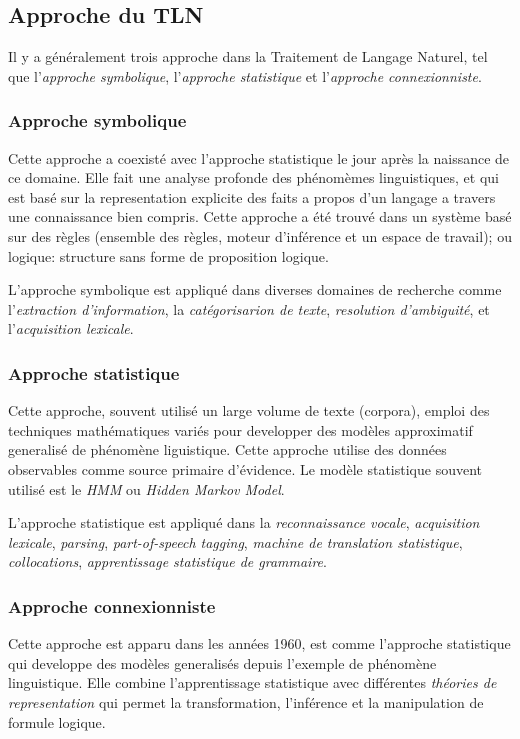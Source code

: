 \subsection{Approche du TLN}
Il y a généralement trois approche dans la Traitement de Langage Naturel, tel que l'\textit{approche symbolique}, l'\textit{approche statistique} et l'\textit{approche connexionniste}.

\subsubsection{Approche symbolique}
Cette approche a coexisté avec l'approche statistique le jour après la naissance de ce domaine. Elle fait une analyse profonde des phénomèmes linguistiques, et qui est basé sur la representation explicite des faits a propos d'un langage a travers une connaissance bien compris. Cette approche a été trouvé dans un système basé sur des règles (ensemble des règles, moteur d'inférence et un espace de travail); ou logique: structure sans forme de proposition logique.

L'approche symbolique est appliqué dans diverses domaines de recherche comme l'\textit{extraction d'information}, la \textit{catégorisarion de texte}, \textit{resolution d'ambiguité}, et l'\textit{acquisition lexicale}.

\subsubsection{Approche statistique}
Cette approche, souvent utilisé un large volume de texte (corpora), emploi des techniques mathématiques variés pour developper des modèles approximatif generalisé de phénomène liguistique. Cette approche utilise des données observables comme source primaire d'évidence. Le modèle statistique souvent utilisé est le \emph{HMM} ou \emph{Hidden Markov Model}.

L'approche statistique est appliqué dans la \textit{reconnaissance vocale}, \textit{acquisition lexicale}, \textit{parsing}, \textit{part-of-speech tagging}, \textit{machine de translation statistique}, \textit{collocations}, \textit{apprentissage statistique de grammaire}.

\subsubsection{Approche connexionniste}
Cette approche est apparu dans les années 1960, est comme l'approche statistique qui developpe des modèles generalisés depuis l'exemple de phénomène linguistique. Elle combine l'apprentissage statistique avec différentes \emph{théories de representation} qui permet la transformation, l'inférence et la manipulation de formule logique.

